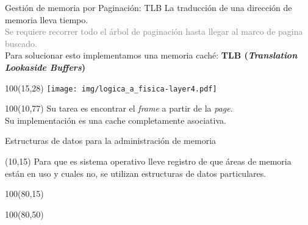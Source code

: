 \documentclass[aspectratio=169]{beamer}
\begin{document}
\begin{frame}[t]{Gestión de memoria por Paginación: TLB}
    \small
    La traducción de una dirección de memoria lleva tiempo.\\
    \textcolor{gray}{Se requiere recorrer todo el árbol de paginación hasta llegar al marco de pagina buscado.}\\
    \medskip
    Para solucionar esto implementamos una memoria caché: \textcolor{naranjauca}{\textbf{TLB (\emph{Translation Lookaside Buffers})}}\\
    \begin{textblock}{100}(15,28)
    \texttt{[image: img/logica\_a\_fisica-layer4.pdf]}
    \end{textblock}
    \begin{textblock}{100}(10,77)
    Su tarea es encontrar el \emph{frame} a partir de la \emph{page}.\\
    Su implementación es una cache completamente asociativa.
    \end{textblock}
\end{frame}

\begin{frame}{Estructuras de datos para la administración de memoria}
    \begin{textblock}{65}(10,15)
    \small
    Para que es sistema operativo lleve registro de que áreas de memoria están en uso y cuales no, se utilizan estructuras de datos particulares.\\
    \vspace{0.7cm}
    \bigskip
    \end{textblock}
    \begin{textblock}{100}(80,15)
    \end{textblock}
    \begin{textblock}{100}(80,50)
    \end{textblock}
\end{frame}
\end{document}
